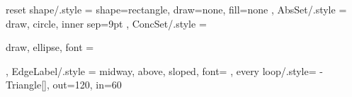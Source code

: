 \newcommand{\appref}[1]{Appendix \ref{#1}}
\newcommand{\fnref}[1]{Footnote \ref{#1}}

\newcommand*{\Boite}{\bgroup\normalfont\ttfamily ▢\egroup}

\newfontfamily{}

\setlength{\epigraphwidth}{.618\textwidth}%
\tikzset
  {
    reset shape/.style = {
      shape=rectangle,
      draw=none,
      fill=none
    },
    AbsSet/.style = {
      draw,
      circle,
      inner sep=9pt
    },
    ConcSet/.style = {
      draw,
      ellipse,
      font = {\itshape\strut}
    },
    EdgeLabel/.style = {
      midway,
      above,
      sloped,
      font=\small
    },
    every loop/.style={
        -{Triangle[]},
        out=120,
        in=60
    }
  }%

\newenvironment{langscibars}{\begin{axis}[ybar,xtick=data, xticklabels from table={\mydata}{pos},
        width  = \textwidth,
	height = .3\textheight,
    	nodes near coords,
	xtick=data,
	x tick label style={},
	ymin=0,
        ]}{\end{axis}}

\newcommand{\langscibar}[1]{\addplot+ table [x=i, y=#1] {\mydata};\addlegendentry{#1};}

\newcommand{\langscidata}[1]{\pgfplotstableread{#1}\mydata;}


\newcommand{\textstylePhono}[1]{#1}
\newcommand{\textstylePhonoApprofondissement}[1]{#1}
\newcommand{\textstylest}[1]{#1}
\newcommand{\textstyleTermes}[1]{\textsc{#1}}
\newcommand{\textstyleTermesapprof}[1]{\textsc{#1}}
\newcommand{\textstyleTermesapprofondissement}[1]{\textsc{#1}}

\newenvironment{styleExemplesuite}{}{}
\newenvironment{styleillustrationAFaire}{\begin{exe}\ex}{\end{exe}} %

\newenvironment{styleLivreImportant}{
\begin{mdframed}[style=tblsfilledbox,frametitle={}]
}{
\end{mdframed}
}

\newenvironment{styleTitreChapitre}{}{}
\newenvironment{styleTitrePartie}{}{}
\newenvironment{styleTitreSection}{}{}
\newenvironment{styleTitreSousSection}{}{}

